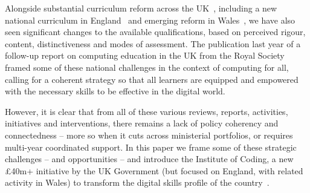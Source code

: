 \documentclass[conference]{IEEEtran}
\begin{document}
Alongside substantial curriculum reform across the
UK~\cite{brown-et-al:toce2014},
including a new national curriculum in England~\cite{DfE2013a} and
emerging reform in
Wales~\cite{wgictreview:2013,moller+crick:jce2018},
we have also seen significant changes to the available qualifications,
based on perceived rigour, content, distinctiveness and modes of
assessment. The publication last year of a follow-up report on
computing education in the UK from the Royal Society~\cite{rs:2017}
framed some of these national challenges in the context of computing
for all, calling for a coherent strategy so that all learners are
equipped and empowered with the necessary skills to be effective in
the digital world.

However, it is clear that from all of these various reviews, reports,
activities, initiatives and interventions, there remains a lack of
policy coherency and connectedness -- more so when it cuts across
ministerial portfolios, or requires multi-year coordinated support. In
this paper we frame some of these strategic challenges -- and
opportunities -- and introduce the Institute of Coding, a new
\pounds40m+ initiative by the UK Government (but focused on England,
with related activity in Wales) to transform the digital skills
profile of the country~\cite{davenport-et-al:cep2019}.




\end{document}
